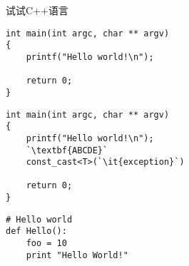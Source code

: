 \documentclass[UTF8,adobefonts,a4paper]{ctexart}
\begin{document}
试试C++语言
\begin{lstlisting}[language={[ANSI]C++}, showstringspaces=false]
int main(int argc, char ** argv)
{
    printf("Hello world!\n");

    return 0;
}
\end{lstlisting}

\begin{lstlisting}[language={[ANSI]C++}, escapeinside=\`\`]
int main(int argc, char ** argv)
{
    printf("Hello world!\n");
    `\textbf{ABCDE}`
	const_cast<T>(`\it{exception}`)

    return 0;
}
\end{lstlisting}


\begin{lstlisting}
# Hello world
def Hello():
    foo = 10
	print "Hello World!"
\end{lstlisting}
\end{document}
